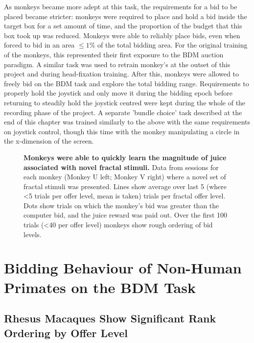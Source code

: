     As monkeys became more adept at this task, the requirements for a bid to be placed became stricter: monkeys were required to place and hold a bid inside the target box for a set amount of time, and the proportion of the budget that this box took up was reduced.  Monkeys were able to reliably place bids, even when forced to bid in an area $\leq 1\%$ of the total bidding area. For the original training of the monkeys, this represented their first exposure to the BDM auction paradigm. A similar task was used to retrain monkey's at the outset of this project and during head-fixation training.
After this, monkeys were allowed to freely bid on the BDM task and explore the total bidding range. Requirements to properly hold the joystick and only move it during the bidding epoch before returning to steadily hold the joystick centred were kept during the whole of the recording phase of the project.
A separate 'bundle choice' task described at the end of this chapter was trained similarly to the above with the same requirements on joystick control, though this time with the monkey manipulating a circle in the x-dimension of the screen.

\begin{figure}[htbp!] 
\centering    

\caption[Monkeys were able to quickly learn the magnitude of juice associated with novel fractal stimuli.]{\textbf{Monkeys were able to quickly learn the magnitude of juice associated with novel fractal stimuli.} Data from sessions for each monkey (Monkey U left; Monkey V right) where a novel set of fractal stimuli was presented. Lines show average over last 5 (where <5 trials per offer level, mean is taken) trials per fractal offer level. Dots show trials on which the monkey's bid was greater than the computer bid, and the juice reward was paid out. Over the first 100 trials (<40 per offer level) monkeys show rough ordering of bid levels.}
\label{fig:monkey_learning}
\end{figure}

\clearpage
\section{Bidding Behaviour of Non-Human Primates on the BDM Task}

\subsection{Rhesus Macaques Show Significant Rank Ordering by Offer Level}\label{sec:bidding_rank_ordered}

